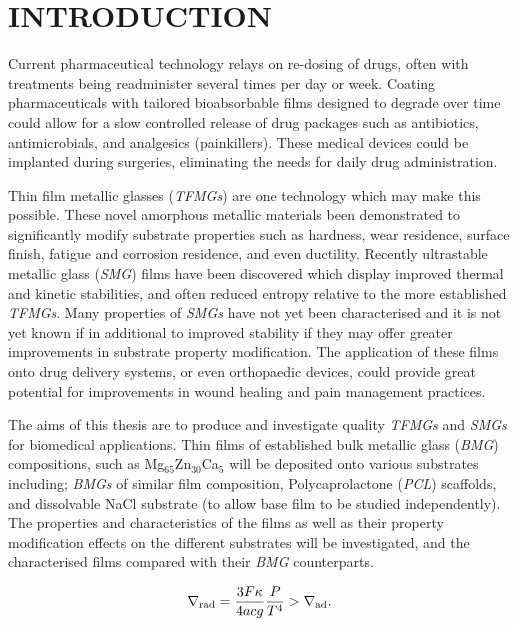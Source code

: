 \section{INTRODUCTION }

Current pharmaceutical technology relays on re-dosing of drugs, often with treatments being readminister several times per day or week. Coating pharmaceuticals with tailored bioabsorbable films designed to degrade over time could allow for a slow controlled release of drug packages such as antibiotics, antimicrobials, and analgesics (painkillers). These medical devices could be implanted during surgeries, eliminating the needs for daily drug administration.  

Thin film metallic glasses (\textit{TFMGs}) are one technology which may make this possible. These novel amorphous metallic materials been demonstrated to significantly modify substrate properties such as hardness, wear residence, surface finish, fatigue and corrosion residence, and even ductility. Recently ultrastable metallic glass (\textit{SMG}) films have been discovered which display improved thermal and kinetic stabilities, and often reduced entropy relative to the more established \textit{TFMGs}. Many properties of \textit{SMGs} have not yet been characterised and it is not yet known if in additional to improved stability if they may offer greater improvements in substrate property modification. The application of these films onto drug delivery systems, or even orthopaedic devices, could provide great potential for improvements in wound healing and pain management practices.

The aims of this thesis are to produce and investigate quality \textit{TFMGs} and \textit{SMGs} for biomedical applications. Thin films of established bulk metallic glass (\textit{BMG}) compositions, such as Mg$_{65}$Zn$_{30}$Ca$_{5}$ will be deposited onto various substrates including; \textit{BMGs} of similar film composition, Polycaprolactone (\textit{PCL}) scaffolds, and dissolvable NaCl substrate (to allow base film to be studied independently). The properties and characteristics of the films as well as their property modification effects on the different substrates will be investigated, and the characterised films compared with their \textit{BMG} counterparts. 

\begin{equation}
\nabla_{\rm rad} = \frac{3F\kappa}{4acg}\frac{P}{T^4} > \nabla_{\rm ad}.
\end{equation}
